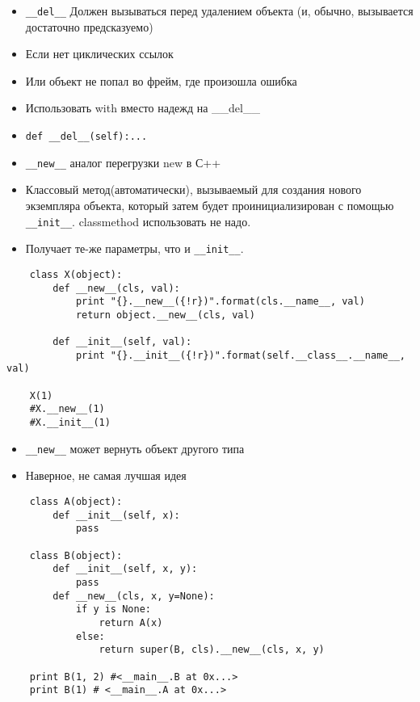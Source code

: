 \documentclass{article}
\begin{document}
\begin{itemize}
	\item \lstinline!__del__! Должен вызываться перед удалением объекта 
		(и, обычно, вызывается достаточно предсказуемо)
	\item Если нет циклических ссылок
	\item Или объект не попал во фрейм, где произошла ошибка
	\item Использовать with вместо надежд на \_\_del\_\_
	\item \lstinline!def __del__(self):...!
\end{itemize}
\newpage

\begin{itemize}
	\item \lstinline!__new__! аналог перегрузки new в С++
	\item Классовый метод(автоматически), вызываемый для создания 
		нового экземпляра объекта, который затем будет проинициализирован 
		с помощью \lstinline!__init__!. classmethod использовать не надо.
	\item Получает те-же параметры, что и \lstinline!__init__!.
\end{itemize}
\vspace{15pt}
\begin{lstlisting}
	class X(object):
	    def __new__(cls, val):
	        print "{}.__new__({!r})".format(cls.__name__, val)
	        return object.__new__(cls, val)
	    
	    def __init__(self, val):
	        print "{}.__init__({!r})".format(self.__class__.__name__, val)

	X(1)
	#X.__new__(1)
	#X.__init__(1)
\end{lstlisting}

\begin{itemize}
	\item \lstinline!__new__! может вернуть объект другого типа
	\item Наверное, не самая лучшая идея
\end{itemize}
\vspace{15pt}
\begin{lstlisting}
	class A(object):
	    def __init__(self, x):
	    	pass

	class B(object):
	    def __init__(self, x, y):
	    	pass
	    def __new__(cls, x, y=None):
	        if y is None:
	            return A(x)
	        else:
	            return super(B, cls).__new__(cls, x, y)

	print B(1, 2) #<__main__.B at 0x...>
	print B(1) # <__main__.A at 0x...>	
\end{lstlisting}
\newpage
\end{document}
